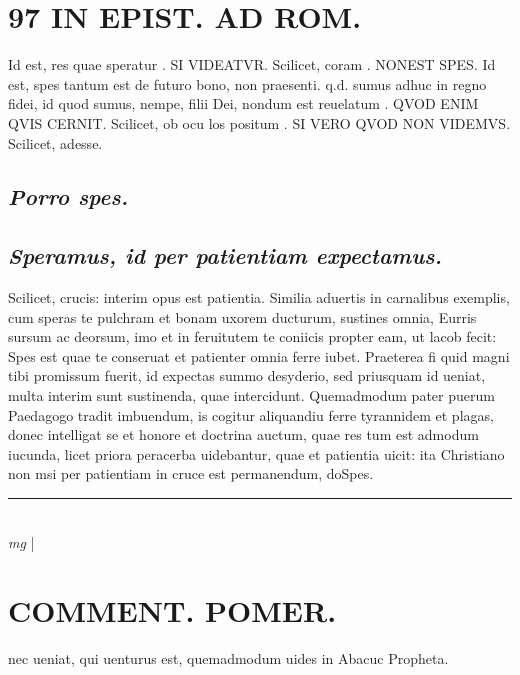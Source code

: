 \documentclass{article}
\begin{document}
\begin{pages}
\section*{97 IN EPIST. AD ROM.  }
\marginpar{[ p.]}\pstart Id est, res quae speratur . SI VIDEATVR.  Scilicet, coram . NONEST SPES. Id est, spes tantum est de futuro bono, non praesenti. q.d. sumus adhuc in regno fidei, id quod sumus, nempe, filii Dei, nondum est reuelatum . QVOD ENIM QVIS CERNIT. Scilicet, ob ocu los positum . SI VERO QVOD NON VIDEMVS. Scilicet, adesse.   \pend
{}
{}
\subsection*{\textit{Porro spes. }}
{}
\subsection*{\textit{Speramus, id per patientiam expectamus. }}\pstart Scilicet, crucis: interim opus est patientia. Similia aduertis in carnalibus exemplis, cum speras te pulchram et bonam uxorem ducturum, sustines omnia, Eurris sursum ac deorsum, imo et in feruitutem te coniicis propter eam, ut lacob fecit: Spes est quae te conseruat et patienter omnia ferre iubet. Praeterea fi quid magni tibi promissum fuerit, id expectas summo desyderio, sed priusquam id ueniat, multa interim sunt sustinenda, quae intercidunt. Quemadmodum pater puerum Paedagogo tradit imbuendum, is cogitur aliquandiu ferre tyrannidem et plagas, donec intelligat se et honore et doctrina auctum, quae res tum est admodum iucunda, licet priora peracerba uidebantur, quae et patientia uicit: ita Christiano non msi per patientiam in cruce est permanendum, doSpes.   \pend
\vspace{0.5cm}\noindent
\vspace{0.2cm}\rule{1cm}{0.2pt}\\ 
\hspace{0.2cm}\textit{mg}
\footnotesize 
\normalsize| 
\section*{COMMENT. POMER.  }\pstart nec ueniat, qui uenturus est, quemadmodum uides in Abacuc Propheta.   \pend
{}
{}

\end{pages}
\end{document}
